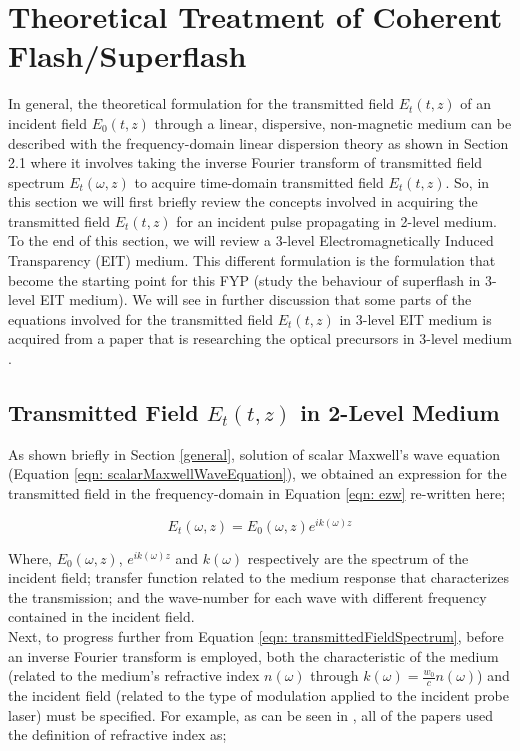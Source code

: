 \section{Theoretical Treatment of Coherent Flash/Superflash}
In general, the theoretical formulation for the transmitted field $E_{t}(t, z)$ of an incident field $E_{0}(t, z)$ through a linear, dispersive, non-magnetic medium can be described with the frequency-domain linear dispersion theory as shown in Section 2.1 where it involves taking the inverse Fourier transform of transmitted field spectrum $E_{t}(\omega, z)$ to acquire time-domain transmitted field $E_{t}(t, z)$. So, in this section we will first briefly review the concepts involved in acquiring the transmitted field $E_{t}(t, z)$ for an incident pulse propagating in 2-level medium. To the end of this section, we will review a 3-level Electromagnetically Induced Transparency (EIT) medium. This different formulation is the formulation that become the starting point for this FYP (study the behaviour of superflash in 3-level EIT medium). We will see in further discussion that some parts of the equations involved for the transmitted field $E_{t}(t, z)$ in 3-level EIT medium is acquired from a paper that is researching the optical precursors in 3-level medium \cite{jeong2010slow}.

\subsection{Transmitted Field $E_{t}(t, z)$ in 2-Level Medium}
As shown briefly in Section \ref{general}, solution of scalar Maxwell's wave equation (Equation \ref{eqn: scalarMaxwellWaveEquation}), we obtained an expression for the transmitted field in the frequency-domain in Equation \ref{eqn: ezw} re-written here;

\begin{equation}
    E_{t}(\omega, z) = E_{0}(\omega, z) e^{ik(\omega)z}
    \label{eqn: transmittedFieldSpectrum}
\end{equation}

Where, $E_{0}(\omega, z)$, $e^{ik(\omega)z}$ and $k(\omega)$ respectively are the spectrum of the incident field; transfer function related to the medium response that characterizes the transmission; and the wave-number for each wave with different frequency contained in the incident field.\\

Next, to progress further from Equation \ref{eqn: transmittedFieldSpectrum}, before an inverse Fourier transform is employed, both the characteristic of the medium (related to the medium's refractive index $n(\omega)$ through $k(\omega) = \frac{w_{0}}{c} n(\omega)$) and the incident field (related to the type of modulation applied to the incident probe laser) must be specified. For example, as can be seen in \cite{Chalony2011, Kwong2014, Kwong2015}, all of the papers used the definition of refractive index as;

